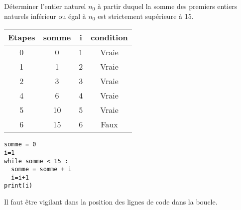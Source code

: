 \begin{minipage}{0.68\linewidth}
\begin{Ex}
Déterminer l'entier naturel $n_0$ à partir duquel la somme des premiers entiers naturels inférieur ou égal à $n_0$ est strictement supérieure à 15.

\begin{tabular}{|c|c|c|c|}
\hline 
Etapes & somme  & i &  condition \\ 
\hline 
0 & 0 & 1 & Vraie \\ 
\hline 
1 & 1 & 2 & Vraie \\ 
\hline 
2 & 3 & 3 & Vraie \\ 
\hline 
4 & 6 & 4 & Vraie \\ 
\hline 
5 & 10 & 5 & Vraie \\ 
\hline
6 & 15 & 6 & Faux \\ 
\hline
\end{tabular} 
\end{Ex}
\end{minipage}
\hfill
\begin{minipage}{0.3\linewidth}
\begin{Cod}
\begin{lstlisting}
somme = 0
i=1
while somme < 15 :	
  somme = somme + i
  i=i+1
print(i)
\end{lstlisting}
\end{Cod}
\end{minipage}

\begin{Att}
Il faut être vigilant dans la position des lignes de code dans la boucle. 
\end{Att}



